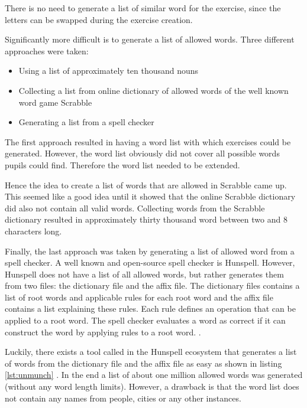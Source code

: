 There is no need to generate a list of similar word for the  exercise, since the letters can be swapped during the exercise creation.

Significantly more difficult is to generate a list of allowed words. Three different approaches were taken:

\begin{itemize}
  \item Using a list of approximately ten thousand nouns
  \item Collecting a list from online dictionary of allowed words of the well known word game Scrabble \cite{Scrabble}
  \item Generating a list from a spell checker
\end{itemize}

The first approach resulted in having a word list with which exercises could be generated. However, the word list obviously did not cover all possible words pupils could find. Therefore the word list needed to be extended.

Hence the idea to create a list of words that are allowed in Scrabble came up. This seemed like a good idea until it showed that the online Scrabble dictionary did also not contain all valid words.
Collecting words from the Scrabble dictionary resulted in approximately thirty thousand word between two and 8 characters long.

Finally, the last approach was taken by generating a list of allowed word from a spell checker. A well known and open-source spell checker is Hunspell. However, Hunspell does not have a list of all allowed words, but rather generates them from two files: the dictionary file and the affix file. The dictionary files contains a list of root words and applicable rules for each root word and the affix file contains a list explaining these rules. Each rule defines an operation that can be applied to a root word. The spell checker evaluates a word as correct if it can construct the word by applying rules to a root word. \cite{Hunspell}.

Luckily, there exists a tool called  in the Hunspell ecosystem that generates a list of words from the dictionary file and the affix file as easy as shown in listing \ref{lst:unmunch} \cite{HunspellGithub}.
In the end a list of about one million allowed words was generated (without any word length limits). However, a drawback is that the word list does not contain any names from people, cities or any other instances. 


